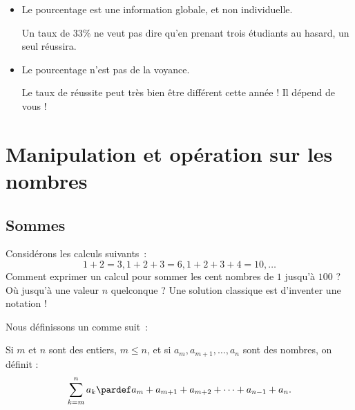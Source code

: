 \begin{frame}
  \begin{itemize}
  \item Le pourcentage est une information globale, et non individuelle.

\begin{example}
  Un taux de 33\% ne veut pas dire qu'en prenant trois étudiants au hasard, un seul réussira.
\end{example}
\pause
\item Le pourcentage n'est pas de la voyance.

\begin{example}
  Le taux de réussite peut très bien être différent cette année ! Il dépend de vous !
\end{example}
\end{itemize}
\end{frame}
\section{Manipulation et opération sur les nombres}
\begin{frame}
  \subsection{Sommes}
  Considérons les calculs suivants~:
  \begin{equation*}
    1 + 2 = 3, 1 + 2 + 3 = 6, 1 + 2 + 3 + 4 = 10, \ldots
  \end{equation*}
  Comment exprimer un calcul pour sommer les cent nombres de \(1\) jusqu'à \(100\) ? Où jusqu'à une valeur \(n\) quelconque ? Une solution classique est d'inventer une notation !

  Nous définissons un %
  comme suit~:
  \begin{definition}
    Si \(m\) et \(n\) sont des entiers, \(m \leq n\), et si \(a_{m}, a_{m+1}, \ldots, a_{n}\) sont des nombres, on définit :
    \begin{equation*}
      \sum_{k = m}^{n} a_{k} \pardef a_{m} + a_{m+1} + a_{m+2} + \cdots + a_{n-1} + a_{n}.
    \end{equation*}
  \end{definition}
\end{frame}

